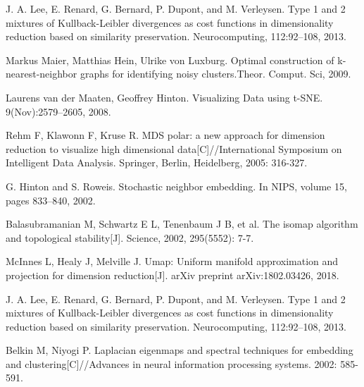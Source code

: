 \documentclass{EPL-master-thesis-covers-EN}
\begin{document}
\begin{thebibliography}{99}
J. A. Lee, E. Renard, G. Bernard, P. Dupont, and M. Verleysen. Type 1 and 2 mixtures of Kullback-Leibler divergences as cost functions in dimensionality reduction based on similarity preservation. Neurocomputing, 112:92–108, 2013.

Markus Maier, Matthias Hein, Ulrike von Luxburg. Optimal construction of k-nearest-neighbor graphs for identifying noisy clusters.Theor. Comput. Sci, 2009.

Laurens van der Maaten, Geoffrey Hinton. Visualizing Data using t-SNE. 9(Nov):2579--2605, 2008.

Rehm F, Klawonn F, Kruse R. MDS polar: a new approach for dimension reduction to visualize high dimensional data[C]//International Symposium on Intelligent Data Analysis. Springer, Berlin, Heidelberg, 2005: 316-327.

G. Hinton and S. Roweis. Stochastic neighbor embedding. In NIPS, volume 15, pages 833–840, 2002.

Balasubramanian M, Schwartz E L, Tenenbaum J B, et al. The isomap algorithm and topological stability[J]. Science, 2002, 295(5552): 7-7.

McInnes L, Healy J, Melville J. Umap: Uniform manifold approximation and projection for dimension reduction[J]. arXiv preprint arXiv:1802.03426, 2018.

J. A. Lee, E. Renard, G. Bernard, P. Dupont, and M. Verleysen. Type 1 and 2 mixtures of Kullback-Leibler divergences as cost functions in dimensionality reduction based on similarity preservation. Neurocomputing, 112:92–108, 2013.

Belkin M, Niyogi P. Laplacian eigenmaps and spectral techniques for embedding and clustering[C]//Advances in neural information processing systems. 2002: 585-591.



\end{thebibliography}

  \backcoverpage
\end{document}
